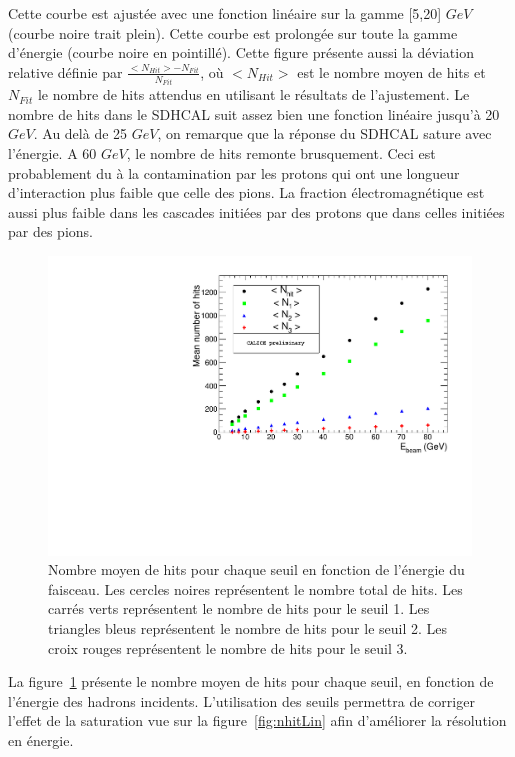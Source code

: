 Cette courbe est ajustée avec une fonction linéaire sur la gamme [5,20] $GeV$ (courbe noire trait plein). Cette courbe est prolongée sur toute la gamme d'énergie (courbe noire en pointillé). Cette figure présente aussi la déviation relative définie par $\frac{<N_{Hit}>-N_{Fit}}{N_{Fit}}$, où $<N_{Hit}>$ est le nombre moyen de hits et $N_{Fit}$ le nombre de hits attendus en utilisant le résultats de l'ajustement. Le nombre de hits dans le SDHCAL suit assez bien une fonction linéaire jusqu'à 20 $GeV$. Au delà de 25 $GeV$, on remarque que la réponse du SDHCAL sature avec l'énergie. A 60 $GeV$, le nombre de hits remonte brusquement. Ceci est probablement du à la contamination par les protons qui ont une longueur d'interaction plus faible que celle des pions. La fraction électromagnétique est aussi plus faible dans les cascades initiées par des protons que dans celles initiées par des pions.

\begin{figure}[!ht]
  \begin{center}
    \includegraphics[width=.7\textwidth]{SDHCAL/figs/Nhit_N1_N2_N3.pdf}
    \caption{Nombre moyen de hits pour chaque seuil en fonction de l'énergie du faisceau. Les cercles noires représentent le nombre total de hits. Les carrés verts représentent le nombre de hits pour le seuil 1. Les triangles bleus représentent le nombre de hits pour le seuil 2. Les croix rouges représentent le nombre de hits pour le seuil 3.}
    \label{fig:nhit123}
  \end{center}
\end{figure}
La figure~\ref{fig:nhit123} présente le nombre moyen de hits pour chaque seuil, en fonction de l'énergie des hadrons incidents. L'utilisation des seuils permettra de corriger l'effet de la saturation vue sur la figure~\ref{fig:nhitLin} afin d'améliorer la résolution en énergie.

